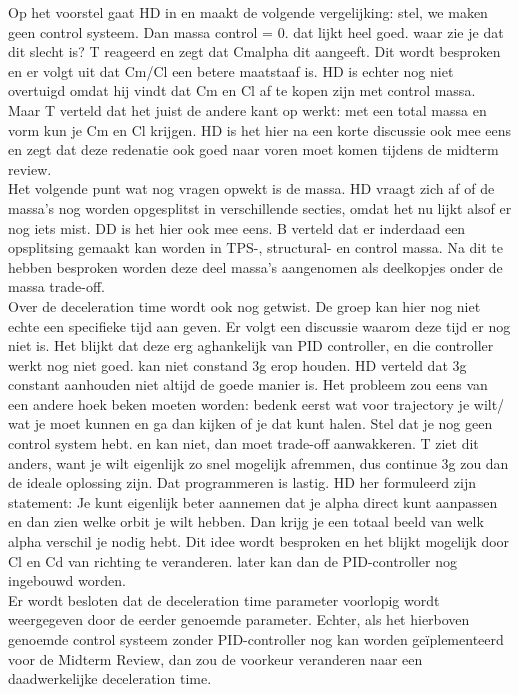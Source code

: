 Op het voorstel gaat HD in en maakt de volgende vergelijking: stel, we maken geen control systeem. Dan massa control = 0. dat lijkt heel goed. waar zie je dat dit slecht is? T reageerd en zegt dat Cmalpha dit aangeeft. Dit wordt besproken en er volgt uit dat Cm/Cl een betere maatstaaf is. HD is echter nog niet overtuigd omdat hij vindt dat Cm en Cl af te kopen zijn met control massa. Maar T verteld dat het juist de andere kant op werkt: met een total massa en vorm kun je Cm en Cl krijgen. HD is het hier na een korte discussie ook mee eens en zegt dat deze redenatie ook goed naar voren moet komen tijdens de midterm review.\\

Het volgende punt wat nog vragen opwekt is de massa. HD vraagt zich af of de massa's nog worden opgesplitst in verschillende secties, omdat het nu lijkt alsof er nog iets mist. DD is het hier ook mee eens. B verteld dat er inderdaad een opsplitsing gemaakt kan worden in TPS-, structural- en control massa. Na dit te hebben besproken worden deze deel massa's aangenomen als deelkopjes onder de massa trade-off.\\

 Over de deceleration time wordt ook nog getwist. De groep kan hier nog niet echte een specifieke tijd aan geven. Er volgt een discussie waarom deze tijd er nog niet is. Het blijkt dat deze erg aghankelijk van PID controller, en die controller werkt nog niet goed. kan niet constand 3g erop houden. HD verteld dat 3g constant aanhouden niet altijd de goede manier is. Het probleem zou eens van een andere hoek beken moeten worden: bedenk eerst wat voor trajectory je wilt/ wat je moet kunnen en ga dan kijken of je dat kunt halen. Stel dat je nog geen control system hebt. en kan niet, dan moet trade-off aanwakkeren. T ziet dit anders, want je wilt eigenlijk zo snel mogelijk afremmen, dus continue 3g zou dan de ideale oplossing zijn. Dat programmeren is lastig. HD her formuleerd zijn statement: Je kunt eigenlijk beter aannemen dat je alpha direct kunt aanpassen en dan zien welke orbit je wilt hebben. Dan krijg je een totaal beeld van welk alpha verschil je nodig hebt. Dit idee wordt besproken en het blijkt mogelijk door Cl en Cd van richting te veranderen. later kan dan de PID-controller nog ingebouwd worden.\\
 
Er wordt besloten dat de deceleration time parameter voorlopig wordt weergegeven door de eerder genoemde parameter. Echter, als het hierboven genoemde control systeem zonder PID-controller nog kan worden geïplementeerd voor de Midterm Review, dan zou de voorkeur veranderen naar een daadwerkelijke deceleration time.\\

